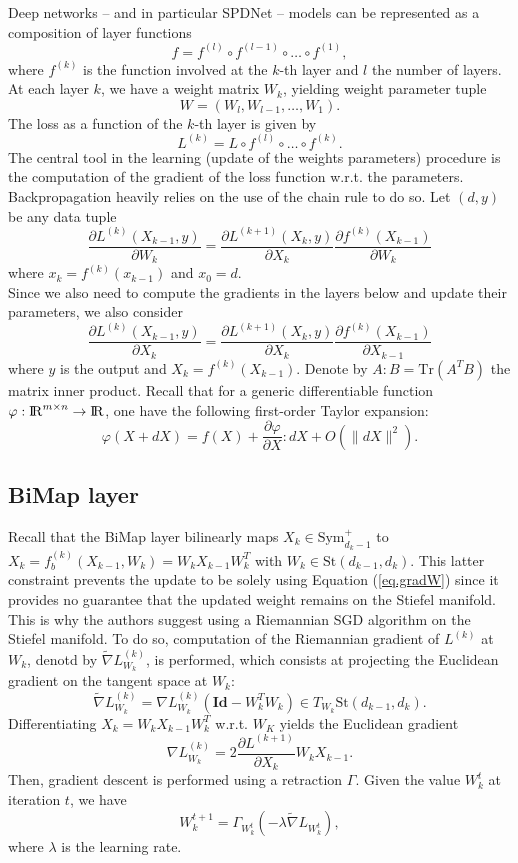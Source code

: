 \documentclass[10pt,a4paper]{book}
\theoremstyle{definition}
\theoremstyle{plain}
\theoremstyle{remark}
\newcommand{\Id}{\mathrm{\textbf{Id}}}
\newcommand \Stif {\textrm{St}}
\def\R{{\rm I\kern-0.16em R}}
\begin{document}
Deep networks -- and in particular SPDNet -- models can be represented as a composition of layer functions
$$f=f^{(l)}\circ f^{(l-1)}\circ \dots \circ f^{(1)},$$
where $f^{(k)}$ is the function involved at the $k$-th layer and $l$ the number of layers.
At each layer $k$, we have a weight matrix $W_k$, yielding weight parameter tuple 
$$W=(W_l, W_{l-1},\dots,W_1).$$
The loss as a function of the $k$-th layer is given by
$$L^{(k)}=L\circ f^{(l)}\circ \dots \circ f^{(k)}.$$
The central tool in the learning (update of the weights parameters) procedure is the computation of the gradient of the loss function w.r.t. the parameters. Backpropagation heavily relies on the use of the chain rule to do so. Let $(d,y)$ be any data tuple
\begin{equation}\label{eq.gradW} 
\frac{\partial L^{(k)}(X_{k-1},y)}{\partial W_k}=\frac{\partial L^{(k+1)}(X_{k},y)}{\partial X_k}\frac{\partial f^{(k)}(X_{k-1})}{\partial W_k}
\end{equation}
where $x_k=f^{(k)}(x_{k-1})$ and $x_0=d$. \\ 
Since we also need to compute the gradients in the layers below and update their parameters, we also consider 
$$
\frac{\partial L^{(k)}(X_{k-1},y)}{\partial X_k}=\frac{\partial L^{(k+1)}(X_{k},y)}{\partial X_k}\frac{\partial f^{(k)}(X_{k-1})}{\partial X_{k-1}}
$$
where $y$ is the output and $X_k=f^{(k)}(X_{k-1})$.
Denote by $A:B=\text{Tr}(A^{T}B)$ the matrix inner product. Recall that for a generic differentiable function $\varphi: \R^{m\times n}\to \R$, one have the following first-order Taylor expansion:
$$\varphi(X+dX)=f(X)+\frac{\partial \varphi}{\partial X}: dX+O(\|dX\|^2).$$
\subsection{BiMap layer}
Recall that the BiMap layer bilinearly maps $X_k \in \text{Sym}_{d_k-1}^{+}$ to $X_k=f_{b}^{(k)}(X_{k-1},W_k)=W_kX_{k-1}W_k^T$ with 
$W_k \in \Stif(d_{k-1},d_k)$. This latter constraint prevents the update to be solely using Equation (\ref{eq.gradW}) since it provides no guarantee that the updated weight remains on the Stiefel manifold.
This is why the authors suggest using a Riemannian SGD algorithm on the Stiefel manifold.
To do so, computation of the Riemannian gradient of $L^{(k)}$ at $W_k$, denotd by $\tilde{\nabla} L^{(k)}_{W_k}$, is performed, which consists at projecting the Euclidean gradient on the tangent space at $W_k$:
$$\tilde{\nabla} L^{(k)}_{W_k}=\nabla L^{(k)}_{W_k}(\Id-W_k^T W_k) \in T_{W_k}\Stif(d_{k-1},d_k).$$
Differentiating $X_k=W_kX_{k-1}W_k^T$ w.r.t. $W_K$ yields the Euclidean gradient
$$\nabla L^{(k)}_{W_k}=2 \frac{\partial L^{(k+1)}}{\partial X_k}W_k X_{k-1}.$$
Then, gradient descent is performed using a retraction $\Gamma$. Given the value $W_k^{t}$ at iteration $t$, we have
$$W_{k}^{t+1}=\Gamma_{W_k^{t}}(-\lambda \tilde{\nabla}L_{W_k^t}),$$
where $\lambda$ is the learning rate.
\end{document}

